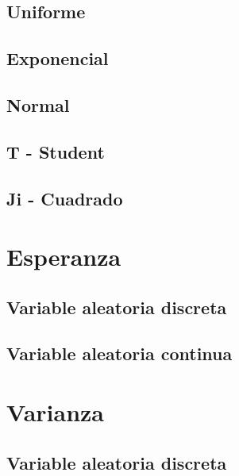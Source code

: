 \documentclass[
]{book}
\begin{document}
\hypertarget{uniforme-1}{%
\subsection{Uniforme}\label{uniforme-1}}

\hypertarget{exponencial}{%
\subsection{Exponencial}\label{exponencial}}

\hypertarget{normal}{%
\subsection{Normal}\label{normal}}

\hypertarget{t---student}{%
\subsection{T - Student}\label{t---student}}

\hypertarget{ji---cuadrado}{%
\subsection{Ji - Cuadrado}\label{ji---cuadrado}}

\hypertarget{esperanza}{%
\section{Esperanza}\label{esperanza}}

\hypertarget{variable-aleatoria-discreta-1}{%
\subsection{Variable aleatoria discreta}\label{variable-aleatoria-discreta-1}}

\hypertarget{variable-aleatoria-continua-1}{%
\subsection{Variable aleatoria continua}\label{variable-aleatoria-continua-1}}

\hypertarget{varianza}{%
\section{Varianza}\label{varianza}}

\hypertarget{variable-aleatoria-discreta-2}{%
\subsection{Variable aleatoria discreta}\label{variable-aleatoria-discreta-2}}
\end{document}
